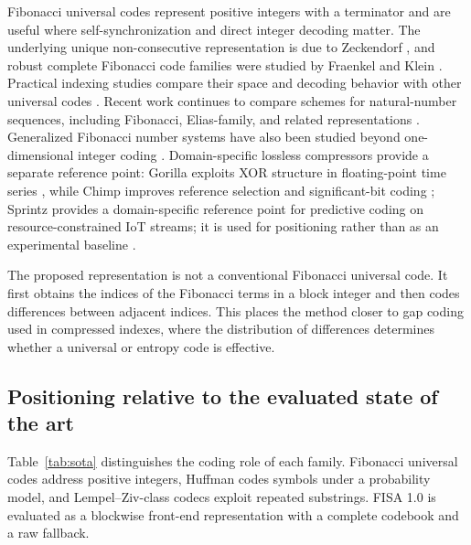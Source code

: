 \documentclass[a4paper,fleqn]{cas-dc}
\begin{document}
Fibonacci universal codes represent positive integers with a terminator and
are useful where self-synchronization and direct integer decoding matter.
The underlying unique non-consecutive representation is due to Zeckendorf
\cite{Zeckendorf1972}, and robust complete Fibonacci code families were
studied by Fraenkel and Klein \cite{Klein1996Fibonacci}.
Practical indexing studies compare their space and decoding behavior with
other universal codes \cite{Brisaboa2021Fibonacci}. Recent work continues to
compare schemes for natural-number sequences, including Fibonacci,
Elias-family, and related representations
\cite{Elias1975,Shapira2023Natural}. Generalized
Fibonacci number systems have also been studied beyond one-dimensional integer
coding \cite{Pooksombat2022Multidim}. Domain-specific lossless compressors
provide a separate reference point: Gorilla exploits XOR structure in
floating-point time series \cite{Pelkonen2015Gorilla}, while Chimp improves
reference selection and significant-bit coding \cite{Liakos2022Chimp};
Sprintz provides a domain-specific reference point for predictive coding on
resource-constrained IoT streams; it is used for positioning rather than as an
experimental baseline \cite{Blalock2018SPRINTZ}.

The proposed representation is not a conventional Fibonacci universal code.
It first obtains the indices of the Fibonacci terms in a block integer and
then codes differences between adjacent indices. This places the method closer
to gap coding used in compressed indexes, where the distribution of
differences determines whether a universal or entropy code is effective.

\subsection{Positioning relative to the evaluated state of the art}

Table~\ref{tab:sota} distinguishes the coding role of each family. Fibonacci
universal codes address positive integers, Huffman codes symbols under a
probability model, and Lempel--Ziv-class codecs exploit repeated
substrings. FISA 1.0 is evaluated as a blockwise front-end representation
with a complete codebook and a raw fallback.
\end{document}
